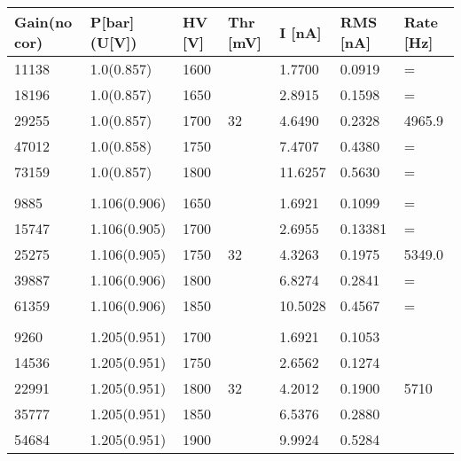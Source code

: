 	
	
	
	\begin{table}[!h]
	\centering
	\begin{tabular}{|l|l|l|l|l|l|l|}
		\hline
		Gain(no cor) & P[bar] (U[V]) & HV [V] & Thr [mV]&  I [nA] & RMS [nA] & Rate [Hz]  \\
		\hline
		11138 & 1.0(0.857) & 1600 & &  1.7700 & 0.0919 & = \\
		\hline
		18196 & 1.0(0.857) & 1650 & &  2.8915 & 0.1598 & = \\
		\hline
		29255 & 1.0(0.857) & 1700 & 32 & 4.6490 & 0.2328 & 4965.9 \\
		\hline
		47012 & 1.0(0.858) & 1750 & & 7.4707 & 0.4380 & = \\
		\hline
		73159 & 1.0(0.857) & 1800 & & 11.6257 & 0.5630 & = \\
		\hline
		
		& & & & & & \\
		\hline
		
		9885 & 1.106(0.906) & 1650 & & 1.6921 & 0.1099 & = \\
		\hline
		15747 & 1.106(0.905)& 1700 & & 2.6955 & 0.13381 & = \\
		\hline
		25275 & 1.106(0.905)& 1750 & 32 & 4.3263 & 0.1975 & 5349.0 \\
		\hline
		39887 & 1.106(0.906)& 1800 & & 6.8274 & 0.2841 & = \\
		\hline
		61359 & 1.106(0.906)& 1850 & & 10.5028 & 0.4567 & = \\
		\hline
		
		& & & & & & \\
		\hline
		
		9260 & 1.205(0.951) & 1700  & & 1.6921 & 0.1053 & \\
		\hline
		14536 & 1.205(0.951) & 1750 & & 2.6562 & 0.1274 & \\
		\hline
		22991 & 1.205(0.951) & 1800 & 32 & 4.2012 & 0.1900 & 5710 \\
		\hline
		35777 & 1.205(0.951) & 1850 & & 6.5376 & 0.2880 & \\
		\hline
		54684 & 1.205(0.951) & 1900 & & 9.9924 & 0.5284 & \\
		\hline
		

\end{tabular}
\end{table}
